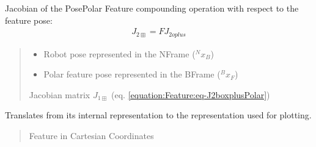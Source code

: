 \documentclass[letterpaper,10pt,english]{sphinxmanual}
\begin{document}
\begin{fulllineitems}
\begin{fulllineitems}
\end{fulllineitems}


\begin{fulllineitems}
\label{\detokenize{Feature:Feature.PolarFeature.J_2boxplus}}
\pysigstartsignatures
{}
\pysigstopsignatures
\sphinxAtStartPar
Jacobian of the Pose\sphinxhyphen{}Polar Feature compounding operation with respect to the feature pose:
\begin{equation}\label{equation:Feature:eq-J2boxplusPolar}
\begin{split}J_{2\boxplus} = F J_{2oplus}\end{split}
\end{equation}\begin{quote}\begin{description}
\begin{itemize}
\item {} 
\sphinxAtStartPar
{} \textendash{} Robot pose represented in the N\sphinxhyphen{}Frame (\(^Nx_B\))

\item {} 
\sphinxAtStartPar
{} \textendash{} Polar feature pose represented in the B\sphinxhyphen{}Frame (\(^Bx_F\))

\end{itemize}

\sphinxAtStartPar
Jacobian matrix \(J_{1\boxplus}\) (eq. \eqref{equation:Feature:eq-J2boxplusPolar})

\end{description}\end{quote}

\end{fulllineitems}


\begin{fulllineitems}
\label{\detokenize{Feature:Feature.PolarFeature.ToCartesian}}
\pysigstartsignatures
{}
\pysigstopsignatures
\sphinxAtStartPar
Translates from its internal representation to the representation used for plotting.
\begin{quote}\begin{description}
\sphinxAtStartPar
Feature in Cartesian Coordinates


\end{description}
\end{quote}
\end{fulllineitems}
\end{fulllineitems}
\end{document}
